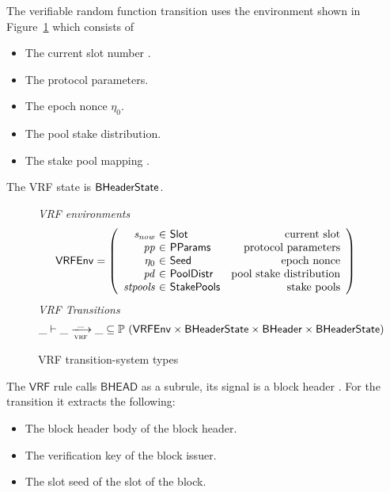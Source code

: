 The verifiable random function transition uses the environment shown in
Figure~\ref{fig:ts-types:vrf} which consists of

\begin{itemize}
\item The current slot number .
\item The protocol parameters.
\item The epoch nonce $\eta_0$.
\item The pool stake distribution.
\item The stake pool mapping .
\end{itemize}

The VRF state is $\mathsf{BHeaderState}$.

\begin{figure}
  \emph{VRF environments}
  \begin{equation*}
    \VRFEnv =
    \left(
      \begin{array}{r@{~\in~}lr}
        \var{s_{now}} & \Slot & \text{current slot} \\
        \var{pp} & \PParams & \text{protocol parameters} \\
        \eta_0 & \Seed & \text{epoch nonce} \\
        \var{pd} & \PoolDistr & \text{pool stake distribution} \\
        \var{stpools} & \StakePools & \text{stake pools} \\
      \end{array}
    \right)
  \end{equation*}
  \emph{VRF Transitions}
  \begin{equation*}
    \_ \vdash \var{\_} \trans{vrf}{\_} \var{\_} \subseteq
    \powerset (\VRFEnv \times \BHeaderState \times \BHeader \times \BHeaderState)
  \end{equation*}
  \caption{VRF transition-system types}
  \label{fig:ts-types:vrf}
\end{figure}

The $\mathsf{VRF}$ rule calls $\mathsf{BHEAD}$ as a subrule, its signal is a
block header . For the transition it extracts the following:

\begin{itemize}
\item The block header body  of the block header.
\item The verification key  of the block issuer.
\item The slot seed  of the slot of the block.
\end{itemize}

